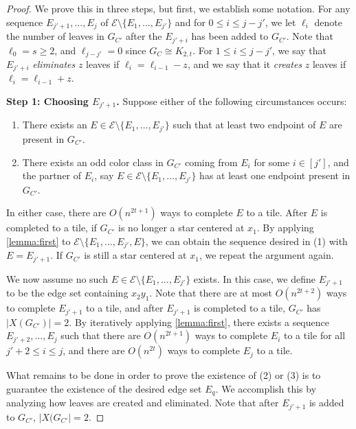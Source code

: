 \documentclass{article}
\theoremstyle{definition}
\begin{document}
\begin{proof}
We prove this in three steps, but first, we establish some notation. For any sequence $E_{j'+1},...,E_{j}$ of $\mathcal{E}\setminus \{E_1,...,E_{j'}\}$ and for $0 \leq i \leq j - j'$, we let $\ell_i$ denote the number of leaves in $G_{C'}$ after the $E_{j'+i}$ has been added to $G_{C'}$. Note that $\ell_0 = s \geq 2$, and $\ell_{j-j'} = 0$ since $G_C \cong K_{2,t}$. For $1 \leq i \leq j - j'$, we say that $E_{j'+i}$ \emph{eliminates} $z$ leaves if $\ell_i = \ell_{i-1} - z$, and we say that it \emph{creates} $z$ leaves if $\ell_i = \ell_{i-1} + z$.



\medskip

\noindent \textbf{Step 1: Choosing $E_{j'+1}$.} Suppose either of the following circumstances occurs:
\begin{enumerate}
    \item[(i)] There exists an $E\in \mathcal{E}\setminus \{E_1,\dots,E_{j'}\}$ such that at least two endpoint of $E$ are present in $G_{C'}$.
    \item[(ii)] There exists an odd color class in $G_{C'}$ coming from $E_{i}$ for some $i\in [j']$, and the partner of $E_{i}$, say $E\in \mathcal{E}\setminus \{E_1,\dots,E_{j'}\}$ has at least one endpoint present in $G_{C'}$.
\end{enumerate}
In either case, there are $O(n^{2t+1})$ ways to complete $E$ to a tile. After $E$ is completed to a tile, if $G_{C'}$ is no longer a star centered at $x_1$. By applying \cref{lemma:first} to $\mathcal{E} \setminus \{E_{1},...,E_{j'},E\}$, we can obtain the sequence desired in (1) with $E = E_{j'+1}$. If $G_{C'}$ is still a star centered at $x_1$, we repeat the argument again.

We now assume no such $E\in \mathcal{E}\setminus \{E_1,...,E_{j'}\}$ exists. In this case, we define $E_{j'+1}$ to be the edge set containing $x_2y_1$. Note that there are at most $O(n^{2t+2})$ ways to complete $E_{j'+1}$ to a tile, and after $E_{j'+1}$ is completed to a tile, $G_{C'}$ has $|X(G_{C'})|=2$. By iteratively applying \cref{lemma:first}, there exists a sequence $E_{j'+2}, \dots, E_{j}$ such that there are $O(n^{2t+1})$ ways to complete $E_i$ to a tile for all $j'+2 \leq i \leq j $, and there are $O(n^{2t})$ ways to complete $E_{j}$ to a tile.  

What remains to be done in order to prove the existence of (2) or (3) is to guarantee the existence of the desired edge set $E_q$. We accomplish this by analyzing how leaves are created and eliminated. Note that after $E_{j'+1}$ is added to $G_{C'}$, $|X(G_{C'}|=2$.



\end{proof}
\end{document}
